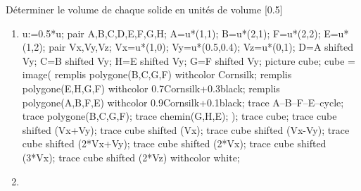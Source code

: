 \begin{exercice*}
    Déterminer le volume de chaque solide en unités de volume \raisebox{-0.5\totalheight}[0.5\totalheight]{}
    \begin{multicols}{2}
        \begin{enumerate}
            \item 
            \begin{Geometrie}[CoinHD={(5u,4u)}]
                u:=0.5*u;
                pair A,B,C,D,E,F,G,H;
                A=u*(1,1);
                B=u*(2,1);
                F=u*(2,2);
                E=u*(1,2);
                pair Vx,Vy,Vz;
                Vx=u*(1,0);
                Vy=u*(0.5,0.4);
                Vz=u*(0,1);
                D=A shifted Vy;
                C=B shifted Vy;
                H=E shifted Vy;
                G=F shifted Vy;
                picture cube;
                cube = image(
                    remplis polygone(B,C,G,F) withcolor Cornsilk;
                    remplis polygone(E,H,G,F) withcolor 0.7Cornsilk+0.3black;
                    remplis polygone(A,B,F,E) withcolor 0.9Cornsilk+0.1black;
                    trace A--B--F--E--cycle;
                    trace polygone(B,C,G,F);
                    trace chemin(G,H,E);
                );        
                trace cube;
                trace cube shifted (Vx+Vy);
                trace cube shifted (Vx);
                trace cube shifted (Vx-Vy);
                trace cube shifted (2*Vx+Vy);
                trace cube shifted (2*Vx);
                trace cube shifted (3*Vx);
                trace cube shifted (2*Vz) withcolor white;
            \end{Geometrie}
            \item

\end{enumerate}
\end{multicols}
\end{exercice*}
